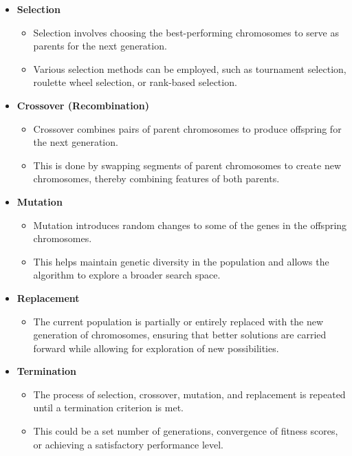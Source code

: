 \begin{itemize}
    \item \textbf{Selection}
          \begin{itemize}
              \item Selection involves choosing the best-performing chromosomes
                    to serve as parents
                    for the next generation.
              \item Various selection methods can be employed, such as
                    tournament selection,
                    roulette wheel selection, or rank-based selection.
          \end{itemize}
          \newpage
    \item \textbf{Crossover (Recombination)}
          \begin{itemize}
              \item Crossover combines pairs of parent chromosomes to produce
                    offspring for the
                    next generation.
              \item This is done by swapping segments of parent chromosomes to
                    create new
                    chromosomes, thereby combining features of both parents.
          \end{itemize}

    \item \textbf{Mutation}
          \begin{itemize}
              \item Mutation introduces random changes to some of the genes in
                    the offspring
                    chromosomes.
              \item This helps maintain genetic diversity in the population and
                    allows the
                    algorithm to explore a broader search space.
          \end{itemize}

    \item \textbf{Replacement}
          \begin{itemize}
              \item The current population is partially or entirely replaced
                    with the new
                    generation of chromosomes, ensuring that better solutions
                    are carried forward
                    while allowing for exploration of new possibilities.
          \end{itemize}

    \item \textbf{Termination}
          \begin{itemize}
              \item The process of selection, crossover, mutation, and
                    replacement is repeated
                    until a termination criterion is met.
              \item This could be a set number of generations, convergence of
                    fitness scores, or
                    achieving a satisfactory performance level.
          \end{itemize}


\end{itemize}
